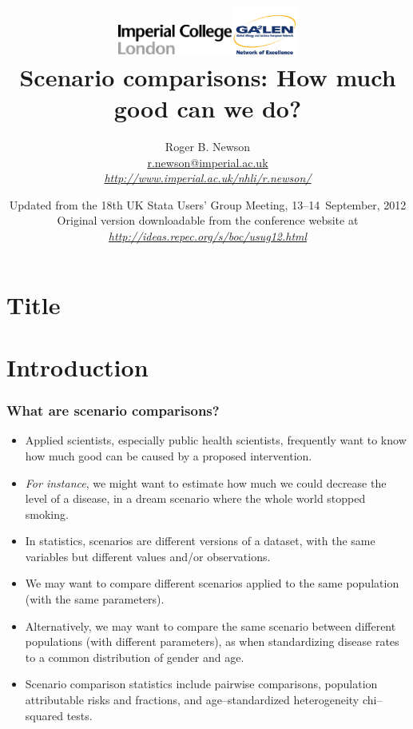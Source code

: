 \documentclass[11pt]{beamer}
\title[Scenario comparisons: How much good can we do?] %
{
\includegraphics[height=1cm]{imperial.pdf}\hfill\includegraphics[height=1.6cm]{ga2len_logo.pdf}\\
\textbf{Scenario comparisons: How much good can we do?}
}
\author[Author, Another] %
{
Roger B. Newson
\\ \href{mailto:r.newson@imperial.ac.uk}{r.newson@imperial.ac.uk}
\\ \href{http://www.imperial.ac.uk/nhli/r.newson/}{\textsl{http://www.imperial.ac.uk/nhli/r.newson/}}
}
\institute[Imperial College London]
{
Imperial College London\\
}
\date[UKSUG 2012] %
{
Updated from the 18th UK Stata Users' Group Meeting, 13--14~September, 2012
\\ Original version downloadable from the conference website at
\\ \href{http://ideas.repec.org/s/boc/usug12.html}{\textsl{http://ideas.repec.org/s/boc/usug12.html}}
}
\begin{document}
\section{Title}

\begin{frame}
  \titlepage
\end{frame}

\section{Introduction}


\begin{frame}
\frametitle{What are scenario comparisons?}

\begin{itemize}

\item<2-> Applied scientists, especially public health scientists, frequently want to know how much good can be caused
by a proposed intervention.

\item<3-> \textit{For instance}, we might want to estimate how much we could decrease the level
of a disease, in a dream scenario where the whole world stopped smoking.

\item<4-> In statistics, scenarios are different versions of a dataset,
with the same variables but different values and/or observations.

\item<5-> We may want to compare different scenarios applied to the same population
(with the same parameters).

\item<6-> Alternatively, we may want to compare the same scenario between different populations
(with different parameters),
as when standardizing disease rates to a common distribution of gender and age.

\item<7-> Scenario comparison statistics include pairwise comparisons,
population attributable risks and fractions,
and age--standardized heterogeneity chi--squared tests.

\end{itemize}

\end{frame}
\end{document}
